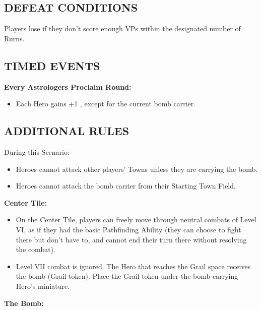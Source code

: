 \begin{multicols}{2}
\subsection*{\MakeUppercase{Defeat Conditions}}
Players lose if they don't score enough VPs within the designated number of Rurns.

\subsection*{\MakeUppercase{Timed Events}}

\textbf{Every Astrologers Proclaim Round:}
\begin{itemize}
  \item Each Hero gains +1 , except for the current bomb carrier.
\end{itemize}

\subsection*{\MakeUppercase{Additional Rules}}

During this Scenario:

\begin{itemize}
  \item Heroes cannot attack other players' Towns unless they are carrying the bomb.
  \item Heroes cannot attack the bomb carrier from their Starting Town Field.
\end{itemize}

\textbf{Center Tile:}

\begin{itemize}
  \item On the Center Tile, players can freely move through neutral combats of Level VI, as if they had the basic Pathfinding Ability (they can choose to fight there but don't have to, and cannot end their turn there without resolving the combat).
  \item Level VII combat is ignored. The Hero that reaches the Grail space receives the bomb (Grail token). Place the Grail token under the bomb-carrying Hero's miniature.
\end{itemize}

\textbf{The Bomb:}


\end{multicols}
